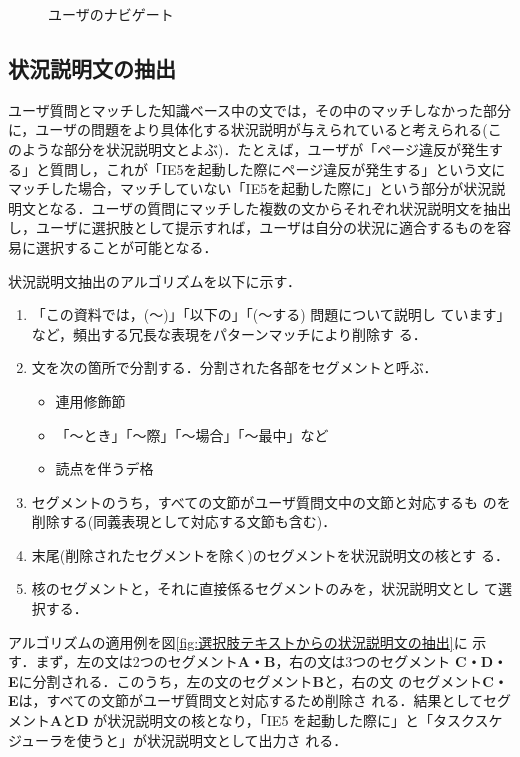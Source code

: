 \begin{figure}
 \begin{center}
  \caption{ユーザのナビゲート} 
\label{fig:ユーザのナビゲート}
 \end{center}
\end{figure}



\subsection{状況説明文の抽出} \label{subsec:状況説明文の抽出}

ユーザ質問とマッチした知識ベース中の文では，その中のマッチしなかった部分
に，ユーザの問題をより具体化する状況説明が与えられていると考えられる(こ
のような部分を状況説明文とよぶ)．たとえば，ユーザが「ページ違反が発生す
る」と質問し，これが「IE5を起動した際にページ違反が発生する」という文に
マッチした場合，マッチしていない「IE5を起動した際に」という部分が状況説
明文となる．ユーザの質問にマッチした複数の文からそれぞれ状況説明文を抽出
し，ユーザに選択肢として提示すれば，ユーザは自分の状況に適合するものを容
易に選択することが可能となる．

状況説明文抽出のアルゴリズムを以下に示す．

\begin{enumerate}
 \item 「この資料では，(〜)」「以下の」「(〜する) 問題について説明し
       ています」など，頻出する冗長な表現をパターンマッチにより削除す
       る．
 \item 文を次の箇所で分割する．分割された各部をセグメントと呼ぶ．
       \begin{itemize}
	\item 連用修飾節
	\item 「〜とき」「〜際」「〜場合」「〜最中」など
	\item 読点を伴うデ格
       \end{itemize}
 \item セグメントのうち，すべての文節がユーザ質問文中の文節と対応するも
       のを削除する(同義表現として対応する文節も含む)．
 \item 末尾(削除されたセグメントを除く)のセグメントを状況説明文の核とす
       る．
 \item 核のセグメントと，それに直接係るセグメントのみを，状況説明文とし
       て選択する．
\end{enumerate}


アルゴリズムの適用例を図\ref{fig:選択肢テキストからの状況説明文の抽出}に
示す．まず，左の文は2つのセグメント{\bf A・B}，右の文は3つのセグメント
{\bf C・D・E}に分割される．このうち，左の文のセグメント{\bf B}と，右の文
のセグメント{\bf C・E}は，すべての文節がユーザ質問文と対応するため削除さ
れる．結果としてセグメント{\bf A}と{\bf D} が状況説明文の核となり，「IE5 
を起動した際に」と「タスクスケジューラを使うと」が状況説明文として出力さ
れる．

